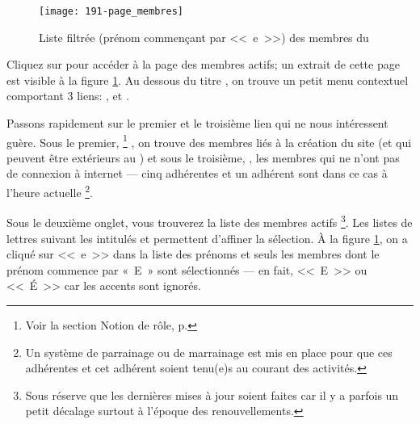 
\label{sec:membres}

\begin{figure}
    \centering
    \texttt{[image: 191-page\_membres]}
    \caption[Liste filtrée des membres du \CdS]{Liste filtrée (prénom commençant par <<~e~>>) des membres du \CdS}
    \label{fig:pageMembres}
\end{figure}
Cliquez sur  pour accéder à la page des membres actifs; un extrait de cette page est visible à la figure \ref{fig:pageMembres}. Au dessous du titre , on trouve un petit menu contextuel comportant 3 liens: ,  et .

Passons rapidement sur le premier et le troisième lien qui ne nous intéressent guère. Sous le premier, %
\footnote{Voir la section \og Notion de rôle\fg, p. \pageref{sec:responsabilitesSite} }
, on trouve des membres liés à la création du site (et qui peuvent être extérieurs au \sel) et sous le troisième, , les membres qui ne n’ont pas de connexion à internet --- cinq adhérentes et un adhérent sont dans ce cas à l’heure actuelle%
\footnote{Un système de parrainage ou de marrainage est mis en place pour que ces adhérentes et cet adhérent soient tenu(e)s au courant des activités.}.

Sous le deuxième onglet, vous trouverez la liste des membres actifs%
\footnote{Sous réserve que les dernières mises à jour soient faites car il  y a parfois un petit décalage surtout à l’époque des renouvellements.}.
Les listes de lettres suivant les intitulés  et  permettent d’affiner la sélection. À la figure \ref{fig:pageMembres}, on a cliqué sur <<~e~>> dans la liste des prénoms et seuls les membres dont le prénom commence par «~E~» sont sélectionnés --- en fait,  <<~E~>> ou <<~É~>> car les accents sont ignorés.

